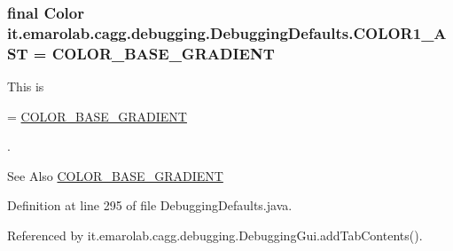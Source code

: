 \hypertarget{classit_1_1emarolab_1_1cagg_1_1debugging_1_1DebuggingDefaults_afdf65da53b98a99e5e2430d46f77d7a4}{
\subsubsection[{C\-O\-L\-O\-R1\-\_\-\-A\-S\-T}]{\setlength{\rightskip}{0pt plus 5cm}final Color it.\-emarolab.\-cagg.\-debugging.\-Debugging\-Defaults.\-C\-O\-L\-O\-R1\-\_\-\-A\-S\-T = {\bf C\-O\-L\-O\-R\-\_\-\-B\-A\-S\-E\-\_\-\-G\-R\-A\-D\-I\-E\-N\-T}\hspace{0.3cm}{\ttfamily [static]}}}\label{classit_1_1emarolab_1_1cagg_1_1debugging_1_1DebuggingDefaults_afdf65da53b98a99e5e2430d46f77d7a4}
This is
\begin{DoxyCode}
= \hyperlink{classit_1_1emarolab_1_1cagg_1_1debugging_1_1DebuggingDefaults_a17491ab8ed655381e8f8cc34e9d3b670}{COLOR\_BASE\_GRADIENT} 
\end{DoxyCode}
 . \begin{DoxySeeAlso}{See Also}
\hyperlink{classit_1_1emarolab_1_1cagg_1_1debugging_1_1DebuggingDefaults_a17491ab8ed655381e8f8cc34e9d3b670}{C\-O\-L\-O\-R\-\_\-\-B\-A\-S\-E\-\_\-\-G\-R\-A\-D\-I\-E\-N\-T} 
\end{DoxySeeAlso}


Definition at line 295 of file Debugging\-Defaults.\-java.



Referenced by it.\-emarolab.\-cagg.\-debugging.\-Debugging\-Gui.\-add\-Tab\-Contents().

